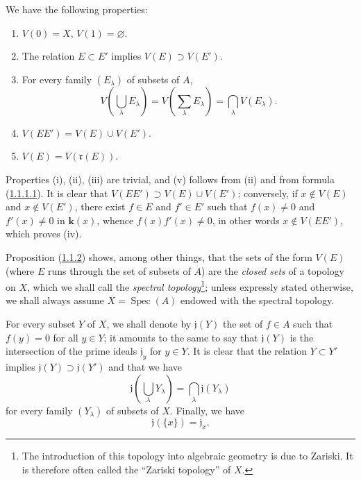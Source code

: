 \begin{proposition}[1.1.2]
\label{I.1.1.2}
We have the following properties:
\begin{enumerate}
  \item[\rm(i)] $V(0)=X$, $V(1)=\varnothing$.
  \item[\rm(ii)] The relation $E\subset E'$ implies $V(E)\supset V(E')$.
  \item[\rm(iii)] For every family $(E_\lambda)$ of subsets of $A$,
  \[
    V\left(\bigcup_\lambda E_\lambda\right)
      =V\left(\sum_\lambda E_\lambda\right)
      =\bigcap_\lambda V(E_\lambda).
  \]
  \item[\rm(iv)] $V(EE')=V(E)\cup V(E')$.
  \item[\rm(v)] $V(E)=V(\mathfrak{r}(E))$.
\end{enumerate}
\end{proposition}

Properties (i), (ii), (iii) are trivial, and (v) follows from (ii) and from
formula (\hyperref[I.1.1.1.1]{1.1.1.1}). It is clear that
$V(EE')\supset V(E)\cup V(E')$; conversely, if $x\notin V(E)$ and
$x\notin V(E')$, there exist $f\in E$ and $f'\in E'$ such that $f(x)\neq0$
and $f'(x)\neq0$ in $\boldsymbol{k}(x)$, whence $f(x)f'(x)\neq0$, in other words
$x\notin V(EE')$, which proves (iv).

Proposition (\hyperref[I.1.1.2]{1.1.2}) shows, among other things, that
the sets of the form $V(E)$ (where $E$ runs through the set of subsets of $A$)
are the \emph{closed sets} of a topology on $X$, which we shall call the
\emph{spectral topology}\footnote{The introduction of this topology into
algebraic geometry is due to Zariski. It is therefore often called the
``Zariski topology'' of $X$.}; unless expressly stated otherwise, we shall
always assume $X=\operatorname{Spec}(A)$ endowed with the spectral topology.

\begin{env}[1.1.3]
\label{I.1.1.3}
For every subset $Y$ of $X$, we shall denote by $\mathfrak{j}(Y)$
the set of $f\in A$ such that $f(y)=0$ for all $y\in Y$; it amounts to the
same to say that $\mathfrak{j}(Y)$ is the intersection of the prime ideals
$\mathfrak{j}_y$ for $y\in Y$. It is clear that the relation $Y\subset Y'$
implies $\mathfrak{j}(Y)\supset\mathfrak{j}(Y')$ and that we have
\begin{equation}
  \mathfrak{j}\left(\bigcup_\lambda Y_\lambda\right)
    =\bigcap_\lambda\mathfrak{j}(Y_\lambda)
  \tag{1.1.3.1}\label{I.1.1.3.1}
\end{equation}
for every family $(Y_\lambda)$ of subsets of $X$. Finally, we have
\begin{equation}
  \mathfrak{j}(\{x\})=\mathfrak{j}_x.
  \tag{1.1.3.2}\label{I.1.1.3.2}
\end{equation}
\end{env}

